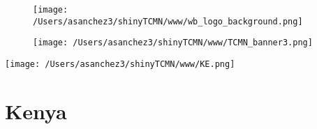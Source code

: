 \documentclass{article}\usepackage[]{graphicx}\usepackage[]{color}
\begin{document}
%

\begin{figure}
  \vspace{-3ex} %
  \hspace{-7ex} %
  \texttt{[image: /Users/asanchez3/shinyTCMN/www/wb\_logo\_background.png]}
\end{figure}
\begin{figure}
  \begin{minipage}[t]{0.99\textwidth} %
      \vspace{-30ex}
      \hspace{-2ex}
      \raggedright{\texttt{[image: /Users/asanchez3/shinyTCMN/www/TCMN\_banner3.png]}}
  \end{minipage}
\end{figure}
%
\begin{minipage}[t]{0.99\textwidth} %
  \vspace{-1.5cm}
  \begin{minipage}[c]{0.36\textwidth} 
    \begin{minipage}[c]{0.28\textwidth} %
      \texttt{[image: /Users/asanchez3/shinyTCMN/www/KE.png]}
    \end{minipage}
    \begin{minipage}[c]{0.70\textwidth} %
      \section*{\color{blue!40!black}Kenya}
    \end{minipage}
  \end{minipage}
  \begin{minipage}[c]{0.63\textwidth}
    \begin{flushleft}  
    \end{flushleft} 
  \end{minipage}  
\end{minipage} %
\end{document}
